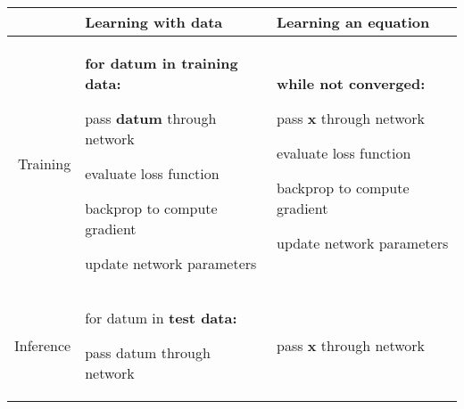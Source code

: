 \documentclass{article}
\begin{document}
  \begin{tabularx}{\textwidth}{| r | X | X |}\hline
              & Learning with data & Learning an equation \\ \hline
    Training  & \textbf{for datum in training data:}\par 
                \hspace{3mm} pass \textbf{datum} through network \par
                \hspace{3mm} evaluate loss function \par
                \hspace{3mm} backprop to compute gradient \par
                \hspace{3mm} update network parameters &
                \textbf{while not converged:}\par
                \hspace{3mm} pass \textbf{x} through network \par
                \hspace{3mm} evaluate loss function \par
                \hspace{3mm} backprop to compute gradient \par
                \hspace{3mm} update network parameters \\ \hline
    Inference & for datum in \textbf{test data:}\par 
                \hspace{3mm} pass datum through network \par & 
                \hspace{3mm} pass \textbf{x} through network \par \\ \hline
  \end{tabularx}
\end{document}
